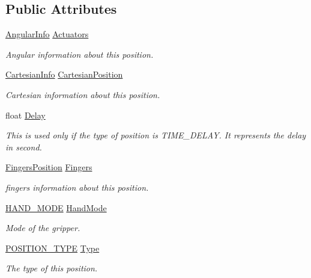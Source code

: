 \subsection*{Public Attributes}
\begin{DoxyCompactItemize}
\item 
\hyperlink{structAngularInfo}{Angular\+Info} \hyperlink{structUserPosition_ab0c5b71622c1e0d3033572578e947cf3}{Actuators}
\begin{DoxyCompactList}\small\item\em Angular information about this position. \end{DoxyCompactList}\item 
\hyperlink{structCartesianInfo}{Cartesian\+Info} \hyperlink{structUserPosition_ab363c40971853637f728978e604c438f}{Cartesian\+Position}
\begin{DoxyCompactList}\small\item\em Cartesian information about this position. \end{DoxyCompactList}\item 
float \hyperlink{structUserPosition_aa18896c1238a50c8ad81c66dfd76ac5e}{Delay}
\begin{DoxyCompactList}\small\item\em This is used only if the type of position is T\+I\+M\+E\+\_\+\+D\+E\+L\+AY. It represents the delay in second. \end{DoxyCompactList}\item 
\hyperlink{structFingersPosition}{Fingers\+Position} \hyperlink{structUserPosition_a727907bb6a98b0f3d10aaa8011b67927}{Fingers}
\begin{DoxyCompactList}\small\item\em fingers information about this position. \end{DoxyCompactList}\item 
\hyperlink{KinovaTypes_8h_ad7050e4cfb6e844e9be962fba8eeb817}{H\+A\+N\+D\+\_\+\+M\+O\+DE} \hyperlink{structUserPosition_a83779902810d0e5e16d533e0f964c0df}{Hand\+Mode}
\begin{DoxyCompactList}\small\item\em Mode of the gripper. \end{DoxyCompactList}\item 
\hyperlink{KinovaTypes_8h_a0a1c22d235ef1b13cfcd1419d10babc9}{P\+O\+S\+I\+T\+I\+O\+N\+\_\+\+T\+Y\+PE} \hyperlink{structUserPosition_a93c748d4ee51239fcbcd487d88e52ffa}{Type}
\begin{DoxyCompactList}\small\item\em The type of this position. \end{DoxyCompactList}\end{DoxyCompactItemize}


